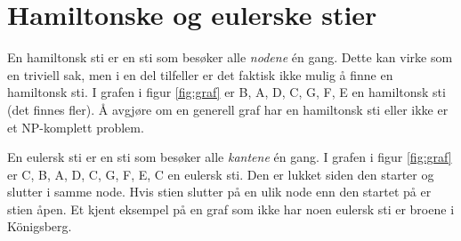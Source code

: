 \section{Hamiltonske og eulerske stier}
En hamiltonsk sti er en sti som besøker alle \textit{nodene} én gang. Dette kan virke som en triviell sak, men i en del tilfeller er det faktisk ikke mulig å finne en hamiltonsk sti. I grafen i figur \ref{fig:graf} er B, A, D, C, G, F, E en hamiltonsk sti (det finnes fler). Å avgjøre om en generell graf har en hamiltonsk sti eller ikke er et NP-komplett problem. 

En eulersk sti er en sti som besøker alle \textit{kantene} {\'e}n gang. I grafen i figur \ref{fig:graf} er C, B, A, D, C, G, F, E, C en eulersk sti. Den er lukket siden den starter og slutter i samme node. Hvis stien slutter på en ulik node enn den startet på er stien åpen. Et kjent eksempel på en graf som ikke har noen eulersk sti er broene i Königsberg. %
%
%
